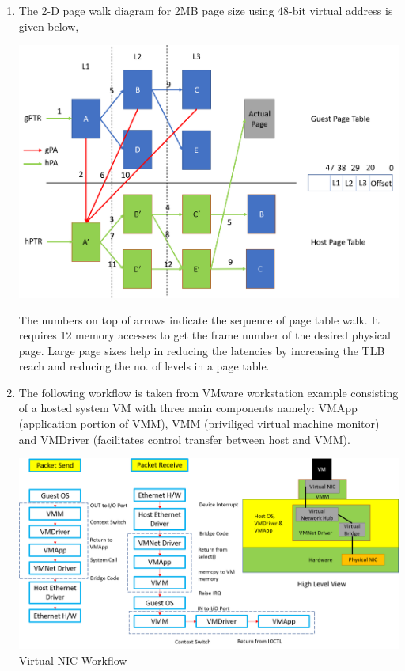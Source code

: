 \documentclass[11pt,a4paper,oneside]{article}
\begin{document}
\begin{enumerate}
		\item The 2-D page walk diagram for 2MB page size using 48-bit virtual address is given below,
		\begin{center}
		   \includegraphics[scale=0.6]{1.png}
		\end{center}
	    The numbers on top of arrows indicate the sequence of page table walk. It requires 12 memory accesses to get the frame number of the desired physical page. Large page sizes help in reducing the latencies by increasing the TLB reach and reducing the no. of levels in a page table.
		
		\item The following workflow is taken from VMware workstation example consisting of a hosted system VM with three main components namely: VMApp (application portion of VMM), VMM (priviliged virtual machine monitor) and VMDriver (facilitates control transfer between host and VMM). 
		
	    \begin{center}
	    	\includegraphics[scale=0.5]{2.png} \\
	    	Virtual NIC Workflow
	    \end{center}
    

\end{enumerate}
\end{document}
